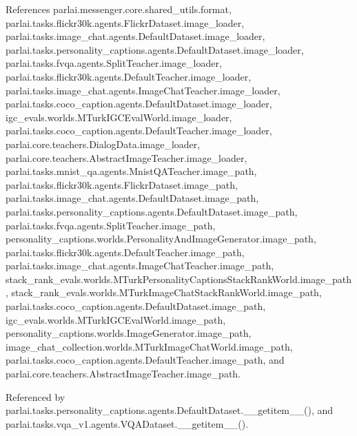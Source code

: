 References parlai.\+messenger.\+core.\+shared\+\_\+utils.\+format, parlai.\+tasks.\+flickr30k.\+agents.\+Flickr\+Dataset.\+image\+\_\+loader, parlai.\+tasks.\+image\+\_\+chat.\+agents.\+Default\+Dataset.\+image\+\_\+loader, parlai.\+tasks.\+personality\+\_\+captions.\+agents.\+Default\+Dataset.\+image\+\_\+loader, parlai.\+tasks.\+fvqa.\+agents.\+Split\+Teacher.\+image\+\_\+loader, parlai.\+tasks.\+flickr30k.\+agents.\+Default\+Teacher.\+image\+\_\+loader, parlai.\+tasks.\+image\+\_\+chat.\+agents.\+Image\+Chat\+Teacher.\+image\+\_\+loader, parlai.\+tasks.\+coco\+\_\+caption.\+agents.\+Default\+Dataset.\+image\+\_\+loader, igc\+\_\+evals.\+worlds.\+M\+Turk\+I\+G\+C\+Eval\+World.\+image\+\_\+loader, parlai.\+tasks.\+coco\+\_\+caption.\+agents.\+Default\+Teacher.\+image\+\_\+loader, parlai.\+core.\+teachers.\+Dialog\+Data.\+image\+\_\+loader, parlai.\+core.\+teachers.\+Abstract\+Image\+Teacher.\+image\+\_\+loader, parlai.\+tasks.\+mnist\+\_\+qa.\+agents.\+Mnist\+Q\+A\+Teacher.\+image\+\_\+path, parlai.\+tasks.\+flickr30k.\+agents.\+Flickr\+Dataset.\+image\+\_\+path, parlai.\+tasks.\+image\+\_\+chat.\+agents.\+Default\+Dataset.\+image\+\_\+path, parlai.\+tasks.\+personality\+\_\+captions.\+agents.\+Default\+Dataset.\+image\+\_\+path, parlai.\+tasks.\+fvqa.\+agents.\+Split\+Teacher.\+image\+\_\+path, personality\+\_\+captions.\+worlds.\+Personality\+And\+Image\+Generator.\+image\+\_\+path, parlai.\+tasks.\+flickr30k.\+agents.\+Default\+Teacher.\+image\+\_\+path, parlai.\+tasks.\+image\+\_\+chat.\+agents.\+Image\+Chat\+Teacher.\+image\+\_\+path, stack\+\_\+rank\+\_\+evals.\+worlds.\+M\+Turk\+Personality\+Captions\+Stack\+Rank\+World.\+image\+\_\+path, stack\+\_\+rank\+\_\+evals.\+worlds.\+M\+Turk\+Image\+Chat\+Stack\+Rank\+World.\+image\+\_\+path, parlai.\+tasks.\+coco\+\_\+caption.\+agents.\+Default\+Dataset.\+image\+\_\+path, igc\+\_\+evals.\+worlds.\+M\+Turk\+I\+G\+C\+Eval\+World.\+image\+\_\+path, personality\+\_\+captions.\+worlds.\+Image\+Generator.\+image\+\_\+path, image\+\_\+chat\+\_\+collection.\+worlds.\+M\+Turk\+Image\+Chat\+World.\+image\+\_\+path, parlai.\+tasks.\+coco\+\_\+caption.\+agents.\+Default\+Teacher.\+image\+\_\+path, and parlai.\+core.\+teachers.\+Abstract\+Image\+Teacher.\+image\+\_\+path.



Referenced by parlai.\+tasks.\+personality\+\_\+captions.\+agents.\+Default\+Dataset.\+\_\+\+\_\+getitem\+\_\+\+\_\+(), and parlai.\+tasks.\+vqa\+\_\+v1.\+agents.\+V\+Q\+A\+Dataset.\+\_\+\+\_\+getitem\+\_\+\+\_\+().


